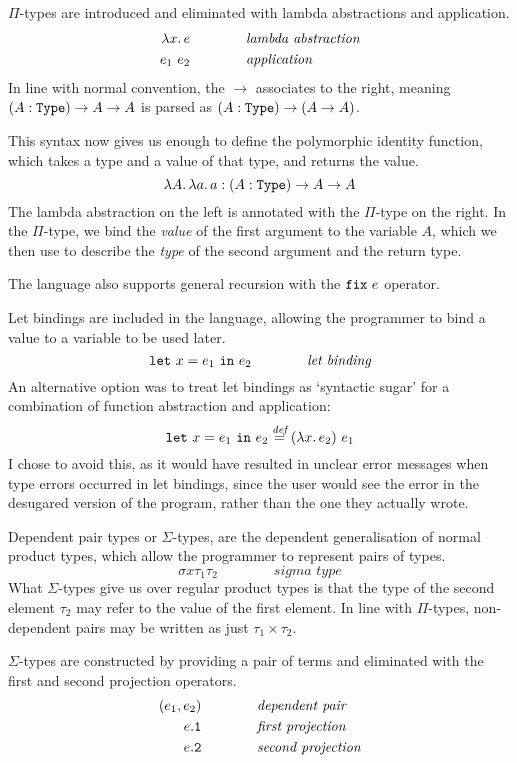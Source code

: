 \documentclass[12pt,a4paper,twoside]{report}
\begin{document}
\(\Pi\)-types are introduced and eliminated with lambda abstractions and application.
\begin{align*}
    \lambda x \ldotp e \qquad\qquad & \textit{lambda abstraction} \\
    e_1\ e_2 \qquad\qquad & \textit{application}
\end{align*}
In line with normal convention, the \(\rightarrow\) associates to the right, meaning \((A : \mathtt{Type}{}) \rightarrow A \rightarrow A\) is parsed as \((A : \mathtt{Type}{}) \rightarrow (A \rightarrow A)\).

This syntax now gives us enough to define the polymorphic identity function, which takes a type and a value of that type, and returns the value.
\[
    \lambda A \ldotp \lambda a \ldotp a : (A : \mathtt{Type}{}) \rightarrow A \rightarrow A
\]
The lambda abstraction on the left is annotated with the \(\Pi\)-type on the right.
In the \(\Pi\)-type, we bind the \emph{value} of the first argument to the variable \(A\), which we then use to describe the \emph{type} of the second argument and the return type.

The language also supports general recursion with the \(\mathtt{fix}\ e\) operator.

Let bindings are included in the language, allowing the programmer to bind a value to a variable to be used later.
\[
    \mathtt{let}\ x = e_1\ \mathtt{in}\ e_2 \qquad\qquad \textit{let binding}
\]
An alternative option was to treat let bindings as `syntactic sugar' for a combination of function abstraction and application:
\[
    \mathtt{let}\ x = e_1\ \mathtt{in}\ e_2 \overset{\textit{def}}{=} (\lambda x \ldotp e_2)\ e_1
\]
I chose to avoid this, as it would have resulted in unclear error messages when type errors occurred in let bindings, since the user would see the error in the desugared version of the program, rather than the one they actually wrote.

Dependent pair types or \(\Sigma\)-types, are the dependent generalisation of normal product types, which allow the programmer to represent pairs of types.
\[
    \sigma{x}{\tau_1}{\tau_2} \qquad\qquad \textit{sigma type}
\]
What \(\Sigma\)-types give us over regular product types is that the type of the second element \(\tau_2\) may refer to the value of the first element.
In line with \(\Pi\)-types, non-dependent pairs may be written as just \(\tau_1 \times \tau_2\).

\(\Sigma\)-types are constructed by providing a pair of terms and eliminated with the first and second projection operators.
\begin{align*}
    (e_1, e_2) \qquad\qquad &\textit{dependent pair} \\
    e\mathtt{.1} \qquad\qquad &\textit{first projection} \\
    e\mathtt{.2} \qquad\qquad &\textit{second projection}
\end{align*}
\end{document}
